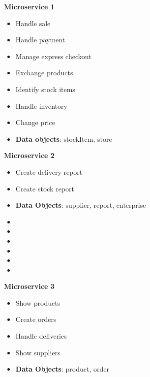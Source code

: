 \begin{multicols}{3}
	\textbf{Microservice 1}
	\begin{flushleft}
	\begin{itemize}[noitemsep]
	\item Handle sale
	\item Handle payment
	\item Manage express checkout
	\item Exchange products
	\item Identify stock items
	\item Handle inventory
	\item Change price
	\item \textbf{Data objects}: stockItem, store
	\end{itemize}
	\end{flushleft}


	\vfill
	\columnbreak
	\textbf{Microservice 2}
	\begin{flushleft}
	\begin{itemize}[noitemsep]
	\item Create delivery report
	\item Create stock report
	\item \textbf{Data Objects}: supplier, report, enterprise
    \item[]
    \item[]
    \item[]
    \item[]
    \item[]
    \item[]
	\end{itemize}
	\end{flushleft}
	
	
	\vfill
	\columnbreak
	\textbf{Microservice 3}
	\begin{flushleft}
	\begin{itemize}[noitemsep]
		\item Show products
		\item Create orders
		\item Handle deliveries
		\item Show suppliers
		\item \textbf{Data Objects}: product, order
	\end{itemize}
\end{flushleft}
\end{multicols}











